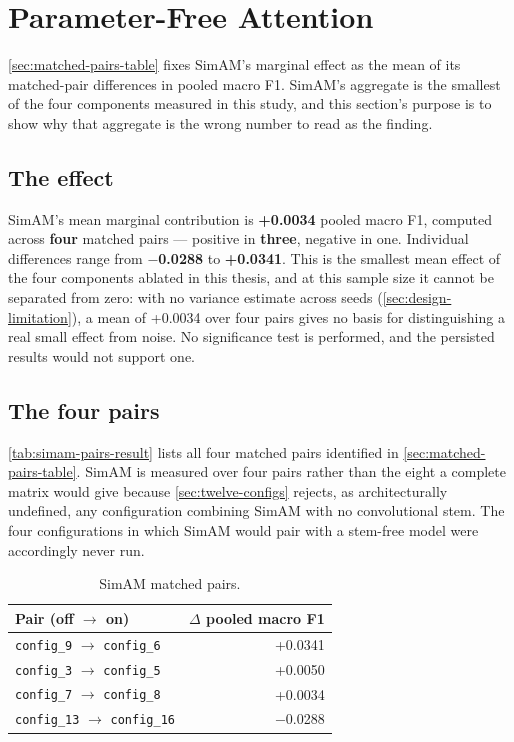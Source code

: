 \section{Parameter-Free Attention}
\label{sec:simam-results}

\autoref{sec:matched-pairs-table} fixes SimAM's marginal effect as the mean of its matched-pair differences in pooled macro F1. SimAM's aggregate is the smallest of the four components measured in this study, and this section's purpose is to show why that aggregate is the wrong number to read as the finding.

\subsection{The effect}
\label{sec:simam-effect-result}

SimAM's mean marginal contribution is \textbf{+0.0034} pooled macro F1, computed across \textbf{four} matched pairs --- positive in \textbf{three}, negative in one. Individual differences range from \textbf{$-$0.0288} to \textbf{+0.0341}. This is the smallest mean effect of the four components ablated in this thesis, and at this sample size it cannot be separated from zero: with no variance estimate across seeds (\autoref{sec:design-limitation}), a mean of +0.0034 over four pairs gives no basis for distinguishing a real small effect from noise. No significance test is performed, and the persisted results would not support one.

\subsection{The four pairs}
\label{sec:simam-four-pairs}

\autoref{tab:simam-pairs-result} lists all four matched pairs identified in \autoref{sec:matched-pairs-table}. SimAM is measured over four pairs rather than the eight a complete matrix would give because \autoref{sec:twelve-configs} rejects, as architecturally undefined, any configuration combining SimAM with no convolutional stem. The four configurations in which SimAM would pair with a stem-free model were accordingly never run.

\begin{table}[htbp]
	\centering
	\begin{tabular}{l r}
		\hline
		\textbf{Pair (off $\rightarrow$ on)} & \textbf{$\Delta$ pooled macro F1} \\
		\hline
		\texttt{config\_9} $\rightarrow$ \texttt{config\_6}   & +0.0341 \\
		\texttt{config\_3} $\rightarrow$ \texttt{config\_5}   & +0.0050 \\
		\texttt{config\_7} $\rightarrow$ \texttt{config\_8}   & +0.0034 \\
		\texttt{config\_13} $\rightarrow$ \texttt{config\_16} & $-$0.0288 \\
		\hline
	\end{tabular}
	\caption[SimAM matched pairs]{SimAM matched pairs.}
	\label{tab:simam-pairs-result}
\end{table}

